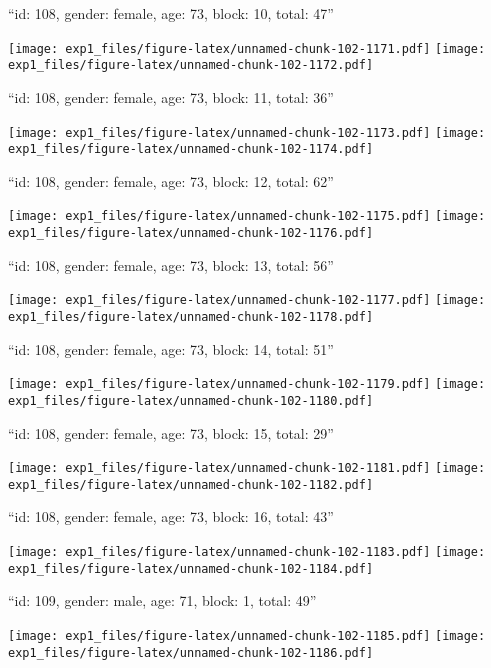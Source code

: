 \documentclass[11pt,,]{article}
\begin{document}
\newpage
[1] 

``id: 108, gender: female, age: 73, block: 10, total: 47''

\texttt{[image: exp1\_files/figure-latex/unnamed-chunk-102-1171.pdf]}
\texttt{[image: exp1\_files/figure-latex/unnamed-chunk-102-1172.pdf]}

\newpage
[1] 

``id: 108, gender: female, age: 73, block: 11, total: 36''

\texttt{[image: exp1\_files/figure-latex/unnamed-chunk-102-1173.pdf]}
\texttt{[image: exp1\_files/figure-latex/unnamed-chunk-102-1174.pdf]}

\newpage
[1] 

``id: 108, gender: female, age: 73, block: 12, total: 62''

\texttt{[image: exp1\_files/figure-latex/unnamed-chunk-102-1175.pdf]}
\texttt{[image: exp1\_files/figure-latex/unnamed-chunk-102-1176.pdf]}

\newpage
[1] 

``id: 108, gender: female, age: 73, block: 13, total: 56''

\texttt{[image: exp1\_files/figure-latex/unnamed-chunk-102-1177.pdf]}
\texttt{[image: exp1\_files/figure-latex/unnamed-chunk-102-1178.pdf]}

\newpage
[1] 

``id: 108, gender: female, age: 73, block: 14, total: 51''

\texttt{[image: exp1\_files/figure-latex/unnamed-chunk-102-1179.pdf]}
\texttt{[image: exp1\_files/figure-latex/unnamed-chunk-102-1180.pdf]}

\newpage
[1] 

``id: 108, gender: female, age: 73, block: 15, total: 29''

\texttt{[image: exp1\_files/figure-latex/unnamed-chunk-102-1181.pdf]}
\texttt{[image: exp1\_files/figure-latex/unnamed-chunk-102-1182.pdf]}

\newpage
[1] 

``id: 108, gender: female, age: 73, block: 16, total: 43''

\texttt{[image: exp1\_files/figure-latex/unnamed-chunk-102-1183.pdf]}
\texttt{[image: exp1\_files/figure-latex/unnamed-chunk-102-1184.pdf]}

\newpage
[1] 

``id: 109, gender: male, age: 71, block: 1, total: 49''

\texttt{[image: exp1\_files/figure-latex/unnamed-chunk-102-1185.pdf]}
\texttt{[image: exp1\_files/figure-latex/unnamed-chunk-102-1186.pdf]}
\end{document}
